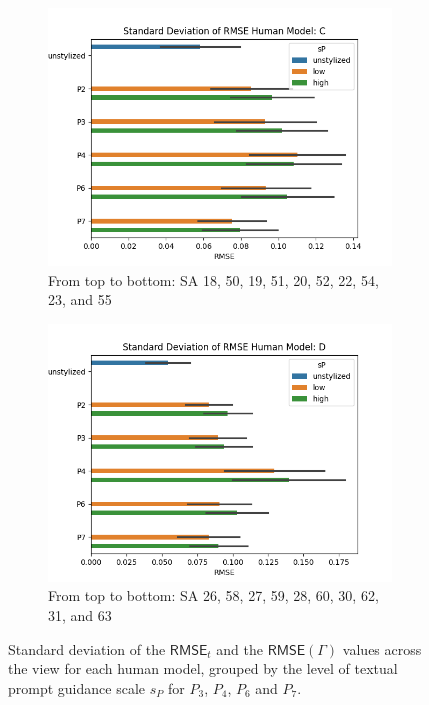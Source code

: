 \begin{figure}[ht]
\begin{subfigure}{0.49\textwidth}
		\includegraphics[width=\linewidth]{Figures/results/good/sd_rmse_irene.png}
		\caption{From top to bottom: SA 18, 50, 19, 51, 20, 52, 22, 54, 23, and 55}
	\end{subfigure}
	\begin{subfigure}{0.49\textwidth}
		\includegraphics[width=\linewidth]{Figures/results/good/sd_rmse_simon.png}
		\caption{From top to bottom: SA 26, 58, 27, 59, 28, 60, 30, 62, 31, and 63}
	\end{subfigure}
	\caption{Standard deviation of the $\mathsf{RMSE}_{t}$ and the $\mathsf{RMSE}(\varGamma)$ values across the view for each human model, grouped by the level of textual prompt guidance scale $s_P$ for $P_3$, $P_4$, $P_6$ and $P_7$.}
	\label{fig:sd_quantitative_distribution_rmse_good}
\end{figure}

